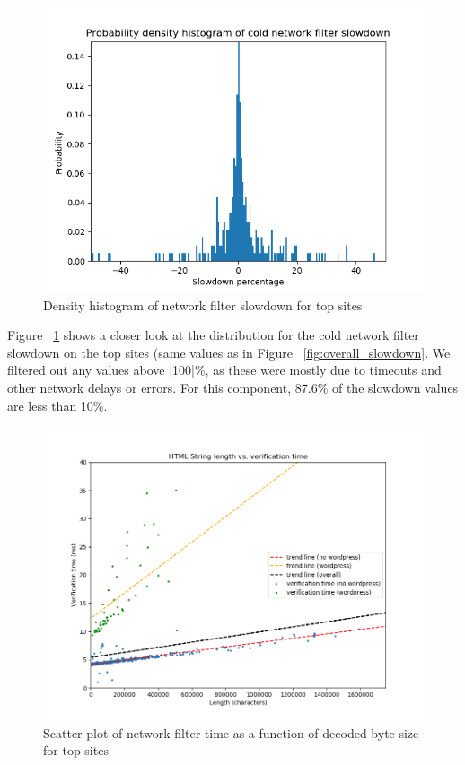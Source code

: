 \begin{figure}[h]
	\includegraphics[scale=0.5]{results/density_histogram_filter_slowdown.png}
	\caption{Density histogram of network filter slowdown for top sites}
	\label{fig:histogram_slowdown}
\end{figure}


Figure ~\ref{fig:histogram_slowdown} shows a closer look at the distribution for the cold network filter slowdown on the top sites (same values as in Figure ~\ref{fig:overall_slowdown}. We filtered out any values above |100|\%, as these were mostly due to timeouts and other network delays or errors. For this component, 87.6\% of the slowdown values are less than 10\%.

\begin{figure}[h]
	\includegraphics[scale=0.37]{results/string_length_vs_verification_time.png}
	\caption{Scatter plot of network filter time as a function of decoded byte size for top sites}
	\label{fig:verification_time_string_length}
\end{figure}

